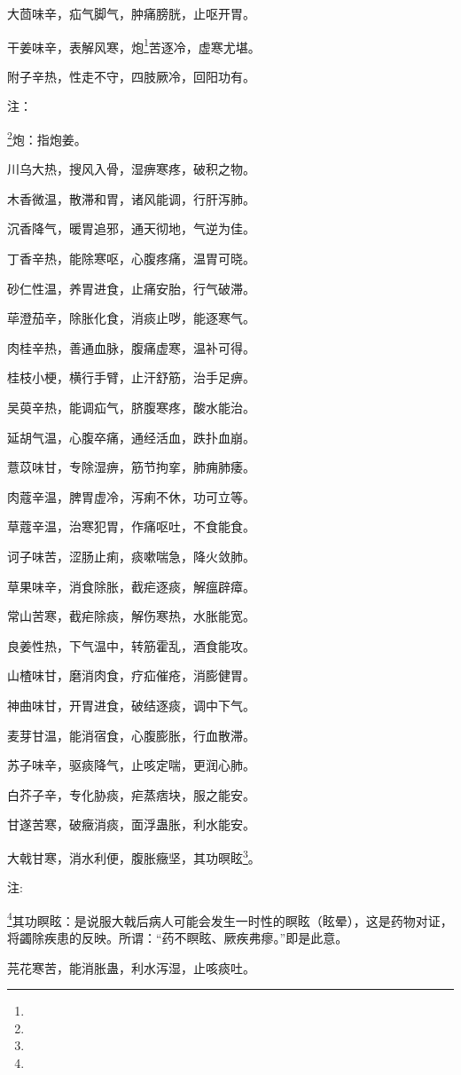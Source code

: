 \documentclass[a4paper,12pt,UTF8,twoside]{ctexbook}
\begin{document}
大茴味辛，疝气脚气，肿痛膀胱，止呕开胃。

干姜味辛，表解风寒，炮\footnote{}苦逐冷，虚寒尤堪。

附子辛热，性走不守，四肢厥冷，回阳功有。

注：

\footnote{}炮：指炮姜。

川乌大热，搜风入骨，湿痹寒疼，破积之物。

木香微温，散滞和胃，诸风能调，行肝泻肺。

沉香降气，暖胃追邪，通天彻地，气逆为佳。

丁香辛热，能除寒呕，心腹疼痛，温胃可晓。

砂仁性温，养胃进食，止痛安胎，行气破滞。

荜澄茄辛，除胀化食，消痰止哕，能逐寒气。

肉桂辛热，善通血脉，腹痛虚寒，温补可得。

桂枝小梗，横行手臂，止汗舒筋，治手足痹。

吴萸辛热，能调疝气，脐腹寒疼，酸水能治。

延胡气温，心腹卒痛，通经活血，跌扑血崩。

薏苡味甘，专除湿痹，筋节拘挛，肺痈肺痿。

肉蔻辛温，脾胃虚冷，泻痢不休，功可立等。

草蔻辛温，治寒犯胃，作痛呕吐，不食能食。

诃子味苦，涩肠止痢，痰嗽喘急，降火敛肺。

草果味辛，消食除胀，截疟逐痰，解瘟辟瘴。

常山苦寒，截疟除痰，解伤寒热，水胀能宽。

良姜性热，下气温中，转筋霍乱，酒食能攻。

山楂味甘，磨消肉食，疗疝催疮，消膨健胃。

神曲味甘，开胃进食，破结逐痰，调中下气。

麦芽甘温，能消宿食，心腹膨胀，行血散滞。

苏子味辛，驱痰降气，止咳定喘，更润心肺。

白芥子辛，专化胁痰，疟蒸痞块，服之能安。

甘遂苦寒，破癥消痰，面浮蛊胀，利水能安。

大戟甘寒，消水利便，腹胀癥坚，其功暝眩\footnote{}。

注:

\footnote{}其功瞑眩：是说服大戟后病人可能会发生一时性的瞑眩（眩晕），这是药物对证，将蠲除疾患的反映。所谓：“药不瞑眩、厥疾弗瘳。”即是此意。

芫花寒苦，能消胀蛊，利水泻湿，止咳痰吐。
\end{document}
